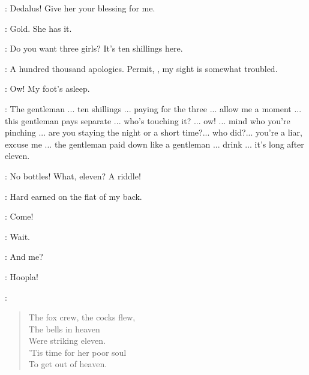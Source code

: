 \Lynch:
Dedalus!
Give her your blessing for me.

\Stephen:
Gold.
She has it.

\Bella:
Do you want three girls?
It's ten shillings here.

\Stephen:
A hundred thousand apologies.
Permit, , my sight is somewhat troubled.


\Florry:
Ow!
My foot's asleep.

\BZKLaB:
The gentleman ...
ten shillings ...
paying for the three ...
allow me a moment ...
this gentleman pays separate ...
who's touching it?
... ow! ...
mind who you're pinching ...
are you staying the night or a short time?...
who did?...
you're a liar, excuse me ...
the gentleman paid down like a gentleman ...
drink ...
it's long after eleven.

\Stephen:
No bottles!
What, eleven?
A riddle!

\Zoe:
Hard earned on the flat of my back.

\Lynch:
Come!

\Kitty:
Wait.

\Florry:
And me?

\Lynch:
Hoopla!

\Stephen:
\begin{verse}
    The fox crew, the cocks flew,\\
    The bells in heaven\\
    Were striking eleven.\\
%
    'Tis time for her poor soul\\
    To get out of heaven.
\end{verse}

